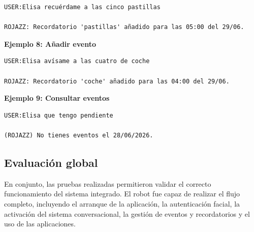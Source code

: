\begin{Verbatim}[breaklines=true]
USER:Elisa recuérdame a las cinco pastillas

ROJAZZ: Recordatorio 'pastillas' añadido para las 05:00 del 29/06.
\end{Verbatim}

\vspace{0.2cm}

\textbf{Ejemplo 8: Añadir evento}

\begin{Verbatim}[breaklines=true]
USER:Elisa avísame a las cuatro de coche

ROJAZZ: Recordatorio 'coche' añadido para las 04:00 del 29/06.
\end{Verbatim}

\vspace{0.2cm}

\textbf{Ejemplo 9: Consultar eventos}

\begin{Verbatim}[breaklines=true]
USER:Elisa que tengo pendiente

(ROJAZZ) No tienes eventos el 28/06/2026.
\end{Verbatim}


\subsection{Evaluación global}

En conjunto, las pruebas realizadas permitieron validar el correcto funcionamiento del sistema integrado. El robot fue capaz de realizar el flujo completo, incluyendo el arranque de la aplicación, la autenticación facial, la activación del sistema conversacional, la gestión de eventos y recordatorios y el uso de las aplicaciones.


